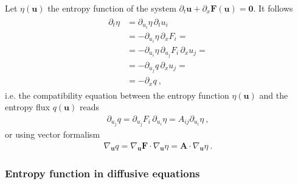 \documentclass[letterpaper,10pt,english]{jupyterBook}
\begin{document}
\sphinxAtStartPar
Let \(\eta(\mathbf{u})\) the entropy function of the system \(\partial_t \mathbf{u} + \partial_x \mathbf{F}(\mathbf{u}) = \mathbf{0}\). It follows
\begin{equation*}
\begin{split}\begin{aligned}
  \partial_t \eta
  & = \partial_{u_i} \eta \, \partial_t u_i \\
  & = - \partial_{u_i} \eta \, \partial_{x} F_i = \\
  & = - \partial_{u_i} \eta \, \partial_{u_j} F_i \, \partial_x u_j = \\
  & = - \partial_{u_j} q \, \partial_x u_j = \\
  & = - \partial_x q \ ,
\end{aligned}\end{split}
\end{equation*}
\sphinxAtStartPar
i.e. the compatibility equation between the entropy function \(\eta(\mathbf{u})\) and the entropy flux \(q(\mathbf{u})\) reads
\begin{equation*}
\begin{split}\partial_{u_j} q = \partial_{u_j} F_i \, \partial_{u_i} \eta = A_{ij} \partial_{u_i} \eta \ ,\end{split}
\end{equation*}
\sphinxAtStartPar
or using vector formalism
\begin{equation*}
\begin{split}\nabla_{\mathbf{u}} q = \nabla_{\mathbf{u}} \mathbf{F} \cdot \nabla_{\mathbf{u}} \eta = \mathbf{A} \cdot \nabla_{\mathbf{u}} \eta \ .\end{split}
\end{equation*}\subsubsection*{Entropy function in diffusive equations}
\end{document}
